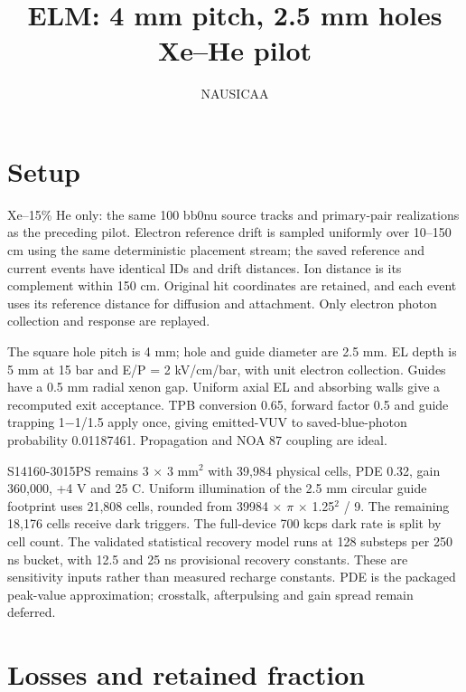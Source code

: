 \documentclass[11pt,a4paper]{article}
\begin{document}
\title{ELM: 4 mm pitch, 2.5 mm holes\\Xe--He pilot}\author{NAUSICAA}\date{}\maketitle
\section*{Setup}
Xe--15\% He only: the same 100 bb0nu source tracks and primary-pair realizations as the preceding pilot. Electron reference drift is sampled uniformly over 10--150 cm using the same deterministic placement stream; the saved reference and current events have identical IDs and drift distances. Ion distance is its complement within 150 cm. Original hit coordinates are retained, and each event uses its reference distance for diffusion and attachment. Only electron photon collection and response are replayed.

The square hole pitch is 4 mm; hole and guide diameter are 2.5 mm. EL depth is 5 mm at 15 bar and E/P = 2 kV/cm/bar, with unit electron collection. Guides have a 0.5 mm radial xenon gap. Uniform axial EL and absorbing walls give a recomputed exit acceptance. TPB conversion 0.65, forward factor 0.5 and guide trapping 1$-$1/1.5 apply once, giving emitted-VUV to saved-blue-photon probability 0.01187461. Propagation and NOA 87 coupling are ideal.

S14160-3015PS remains 3 $\times$ 3 mm$^2$ with 39,984 physical cells, PDE 0.32, gain 360,000, +4 V and 25 C. Uniform illumination of the 2.5 mm circular guide footprint uses 21,808 cells, rounded from 39984 $\times$ $\pi$ $\times$ 1.25$^2$ / 9. The remaining 18,176 cells receive dark triggers. The full-device 700 kcps dark rate is split by cell count. The validated statistical recovery model runs at 128 substeps per 250 ns bucket, with 12.5 and 25 ns provisional recovery constants. These are sensitivity inputs rather than measured recharge constants. PDE is the packaged peak-value approximation; crosstalk, afterpulsing and gain spread remain deferred.
\section*{Losses and retained fraction}\begin{center}\end{center}
\end{document}
